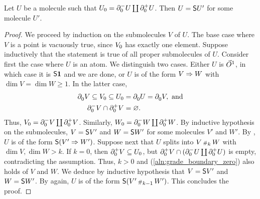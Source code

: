 \begin{lem} \label{lem:has_two_point_is_susp}
    Let \( U \) be a molecule such that \( \gr{0}{U} = \bd{0}{-} U \coprod \bd{0}{+} U \).
    Then \( U = \sus{U'} \) for some molecule \( U' \).
\end{lem}
\begin{proof}
    We proceed by induction on the submolecules \( V \) of \( U \).
    The base case where \( V \) is a point is vacuously true, since \( \gr{0}{V} \) has exactly one element.
    Suppose inductively that the statement is true of all proper submolecules of \( U \).
    Consider first the case where \( U \) is an atom.
    We distinguish two cases.
    Either \( U \) is \( \dglobe{1} \), in which case it is \( \sus{\pt} \) and we are done, or \( U \) is of the form \( V \celto W \) with \( \dim V = \dim W \geq 1 \).
    In the latter case,
    \begin{align} 
         \bd{0}{} V \subseteq \gr{0}{V} \subseteq \gr{0}{U} &= \bd{0}{} U = \bd{0}{} V, \text{ and} \nonumber\\
         \bd{0}{-} V \cap \bd{0}{+} V &= \varnothing \label{aln:grade_boundary_zero}.
    \end{align}
    Thus, \( \gr{0}{V} = \bd{0}{-} V \coprod \bd{0}{+} V\).
    Similarly, \( \gr{0}{W} = \bd{0}{-} W \coprod \bd{0}{+} W \).
    By inductive hypothesis on the submolecules, \( V = \sus{V'} \) and \( W = \sus{W'} \) for some molecules \( V' \) and \( W' \).
    By \cite[Proposition 7.3.16]{hadzihasanovic2024combinatorics}, \( U \) is of the form \( \sus{(V' \celto W')} \).
    Suppose next that \( U \) splits into \( V \cp{k} W \) with \( \dim V, \dim W > k \).
    If \( k = 0 \), then \( \bd{0}{+} V \subseteq \gr{0}{U} \), but \( \bd{0}{+} V \cap (\bd{0}{-} U \coprod \bd{0}{+} U) \) is empty, contradicting the assumption.
    Thus, \( k > 0 \) and (\ref{aln:grade_boundary_zero}) also holds of \( V \) and \( W \).
    We deduce by inductive hypothesis that \( V = \sus{V'} \) and \( W = \sus{W'} \).
    By \cite[Proposition 7.3.16]{hadzihasanovic2024combinatorics} again, \( U \) is of the form \( \sus{(V' \cp{k - 1} W')} \).
    This concludes the proof.
\end{proof}

